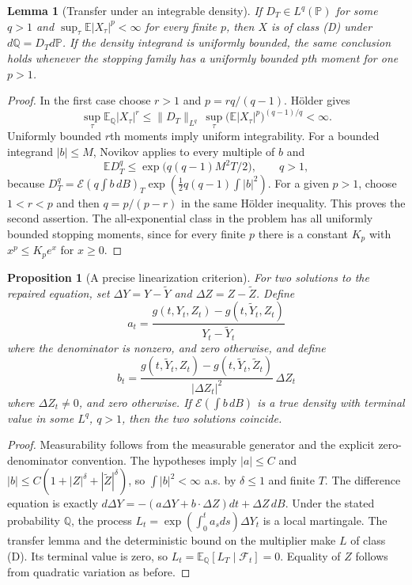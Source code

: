 \documentclass[11pt,a4paper]{article}
\newcommand{\E}{\mathbb E}
\newcommand{\Pp}{\mathbb P}
\newcommand{\Q}{\mathbb Q}
\newcommand{\F}{\mathcal F}
\newcommand{\cE}{\mathcal E}
\newtheorem{lemma}[theorem]{Lemma}
\newtheorem{proposition}[theorem]{Proposition}
\theoremstyle{definition}
\begin{document}
\begin{lemma}[Transfer under an integrable density]
If $D_T\in L^q(\Pp)$ for some $q>1$ and
$\sup_\tau\E|X_\tau|^p<\infty$ for every finite $p$, then $X$ is of class (D) under $d\Q=D_Td\Pp$. If the density integrand is uniformly bounded, the same conclusion holds whenever the stopping family has a uniformly bounded $p$th moment for one $p>1$.
\end{lemma}
\begin{proof}
In the first case choose $r>1$ and $p=rq/(q-1)$. H\"older gives
\[
 \sup_\tau\E_{\Q}|X_\tau|^r
 \le\|D_T\|_{L^q}\,
       \sup_\tau\bigl(\E|X_\tau|^p\bigr)^{(q-1)/q}<\infty.
\]
Uniformly bounded $r$th moments imply uniform integrability. For a bounded integrand $|b|\le M$, Novikov applies to every multiple of $b$ and
\[
 \E D_T^q\le \exp\bigl(q(q-1)M^2T/2\bigr),\qquad q>1,
\]
because $D_T^q=\cE(q\int b\,dB)_T
\exp(\frac12q(q-1)\int|b|^2)$.
For a given $p>1$, choose $1<r<p$ and then $q=p/(p-r)$ in the same H\"older inequality. This proves the second assertion. The all-exponential class in the problem has all uniformly bounded stopping moments, since for every finite $p$ there is a constant $K_p$ with $x^p\le K_pe^x$ for $x\ge0$.
\end{proof}

\begin{proposition}[A precise linearization criterion]
For two solutions to the repaired equation, set $\Delta Y=Y-\widetilde Y$ and $\Delta Z=Z-\widetilde Z$. Define
\[
 a_t=\frac{g(t,Y_t,Z_t)-g(t,\widetilde Y_t,Z_t)}{Y_t-\widetilde Y_t}
\]
where the denominator is nonzero, and zero otherwise, and define
\[
 b_t=\frac{g(t,\widetilde Y_t,Z_t)-g(t,\widetilde Y_t,\widetilde Z_t)}
 {|\Delta Z_t|^2}\,\Delta Z_t
\]
where $\Delta Z_t\ne0$, and zero otherwise. If $\cE(\int b\,dB)$ is a true density with terminal value in some $L^q$, $q>1$, then the two solutions coincide.
\end{proposition}
\begin{proof}
Measurability follows from the measurable generator and the explicit zero-denominator convention. The hypotheses imply $|a|\le C$ and
$|b|\le C(1+|Z|^\delta+|\widetilde Z|^\delta)$, so $\int|b|^2<\infty$ a.s. by $\delta\le1$ and finite $T$. The difference equation is exactly
$d\Delta Y=-(a\Delta Y+b\cdot\Delta Z)dt+\Delta Z\,dB$.
Under the stated probability $\Q$, the process
$L_t=\exp(\int_0^ta_sds)\Delta Y_t$ is a local martingale. The transfer lemma and the deterministic bound on the multiplier make $L$ of class (D). Its terminal value is zero, so $L_t=\E_\Q[L_T\mid\F_t]=0$. Equality of $Z$ follows from quadratic variation as before.
\end{proof}
\end{document}
